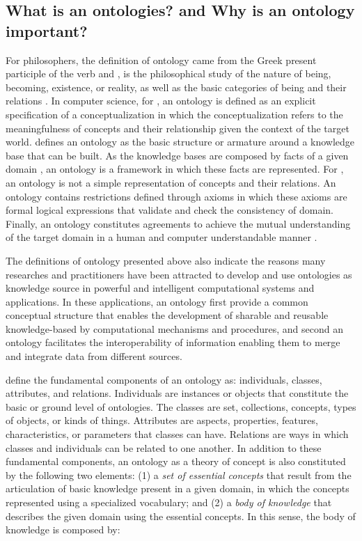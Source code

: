 \subsection{What is an ontologies? and Why is an ontology important?}
\label{subsec:ontologies}

For philosophers, the definition of ontology came from the Greek  present participle of the verb  and , is the philosophical study of the nature of being, becoming, existence, or reality, as well as the basic categories of being and their relations \cite{Wikipedia2014}.
In computer science, for , an ontology is defined as an explicit specification of a conceptualization in which the conceptualization refers to the meaningfulness of concepts and their relationship given the context of the target world.  defines an ontology as the basic structure or armature around a knowledge base that can be built.
As the knowledge bases are composed by facts of a given domain \cite{Hayes-RothWatermanLenat1983}, an ontology is a framework in which these facts are represented.
For \cite{GuarinoOberleStaab2009}, an ontology is not a simple representation of concepts and their relations.
An ontology contains restrictions defined through axioms in which these axioms are formal logical expressions that validate and check the consistency of domain.
Finally, an ontology constitutes agreements to achieve the mutual understanding of the target domain in a human and computer understandable manner \cite{Mizoguchi2004a}.

The definitions of ontology presented above also indicate the reasons  many researches and practitioners have been attracted to develop and use ontologies as knowledge source in powerful and intelligent computational systems and applications.
In these applications, an ontology first provide a common conceptual structure that enables the development of sharable and reusable knowledge-based by computational mechanisms and procedures, and second an ontology facilitates the interoperability of information enabling them to merge and integrate data from different sources.

 define the fundamental components of an ontology as: individuals, classes, attributes, and relations. Individuals are instances or objects that constitute the basic or ground level of ontologies.
The classes are set, collections, concepts, types of objects, or kinds of things.
Attributes are aspects, properties, features, characteristics, or parameters that classes can have.
Relations are ways in which classes and individuals can be related to one another.
In addition to these fundamental components, an ontology as a theory of concept \cite{Mizoguchi2004} is also constituted by the following two elements:
(1) a \emph{set of essential concepts} that result from the articulation of basic knowledge present in a given domain, in which the concepts represented using a specialized vocabulary; and
(2) a \emph{body of knowledge} that describes the given domain using the essential concepts.
In this sense, the body of knowledge is composed by:

